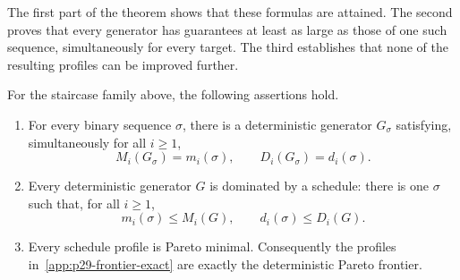 The first part of the theorem shows that these formulas are attained.
The second proves that every generator has guarantees at least as large
as those of one such sequence, simultaneously for every target. The third
establishes that none of the resulting profiles can be improved further.

\begin{suppthm}
\label{app:p29-frontier-theorem}
For the staircase family above, the following assertions hold.
\begin{enumerate}
\item For every binary sequence $\sigma$, there is a deterministic
generator $G_\sigma$ satisfying, simultaneously for all $i\ge1$,
\begin{equation}
\label{app:p29-frontier-exact}
 M_i(G_\sigma)=m_i(\sigma),\qquad
 D_i(G_\sigma)=d_i(\sigma).
\end{equation}
\item Every deterministic generator $G$ is dominated by a schedule:
there is one $\sigma$ such that, for all $i\ge1$,
\begin{equation}
\label{app:p29-frontier-domination}
 m_i(\sigma)\le M_i(G),\qquad d_i(\sigma)\le D_i(G).
\end{equation}
\item Every schedule profile is Pareto minimal. Consequently the
profiles in~\eqref{app:p29-frontier-exact} are exactly the deterministic
Pareto frontier.
\end{enumerate}
\end{suppthm}
